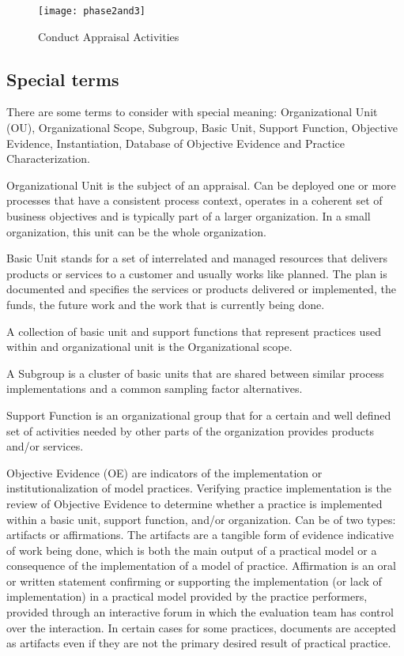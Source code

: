 \begin{figure}[h]
	\begin{center}
		\leavevmode
		\texttt{[image: phase2and3]}
		\caption{Conduct Appraisal Activities}
		\label{fig:results_appraisal}
	\end{center}
\end{figure}

\subsection{Special terms}
There are some terms to consider with special meaning: Organizational Unit (OU), Organizational Scope, Subgroup, Basic Unit, Support Function, Objective Evidence, Instantiation, Database of Objective Evidence and Practice Characterization.

Organizational Unit is the subject of an appraisal. Can be deployed one or more processes that have a consistent process context, operates in a coherent set of business objectives and is typically part of a larger organization. In a small organization, this unit can be the whole organization.

Basic Unit stands for a set of interrelated and managed resources that delivers products or services to a customer and usually works like planned. The plan is documented and specifies the services or products delivered or implemented, the funds, the future work and the work that is currently being done.

A collection of basic unit and support functions that represent practices used within and organizational unit is the Organizational scope.


A Subgroup is a cluster of basic units that are shared between similar process implementations and a common sampling factor alternatives.

Support Function is an organizational group that for a certain and well defined set of activities needed by other parts of the organization provides products and/or services.


Objective Evidence (OE) are indicators of the implementation or institutionalization of model practices. Verifying practice implementation is the review of Objective Evidence to determine whether a practice is implemented within a basic unit, support function, and/or organization. Can be of two types: artifacts or affirmations.
The artifacts are a tangible form of evidence indicative of work being done, which is both the main output of a practical model or a consequence of the implementation of a model of practice.
Affirmation is an oral or written statement confirming or supporting the implementation (or lack of implementation) in a practical model
provided by the practice performers, provided through an interactive forum in which the evaluation team has control over the
interaction.
In certain cases for some practices, documents are accepted as artifacts even if they are not the primary desired result of practical practice.

